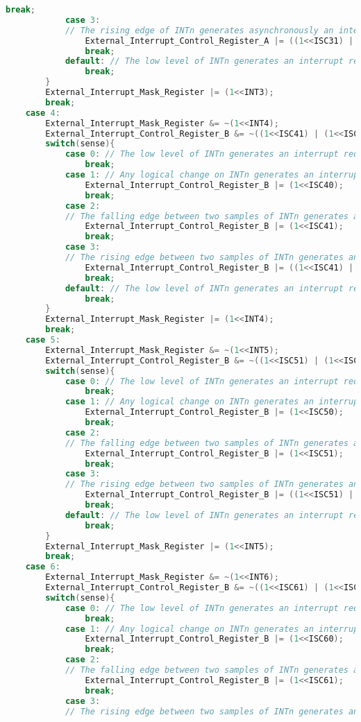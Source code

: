 \begin{lstlisting}[language=C]
				break;
			case 3: 
			// The rising edge of INTn generates asynchronously an interrupt request.
				External_Interrupt_Control_Register_A |= ((1<<ISC31) | (1<<ISC30));
				break;
			default: // The low level of INTn generates an interrupt request.
				break;
		}
		External_Interrupt_Mask_Register |= (1<<INT3);
		break;
	case 4:
		External_Interrupt_Mask_Register &= ~(1<<INT4);
		External_Interrupt_Control_Register_B &= ~((1<<ISC41) | (1<<ISC40));
		switch(sense){
			case 0: // The low level of INTn generates an interrupt request.
				break;
			case 1: // Any logical change on INTn generates an interrupt request
				External_Interrupt_Control_Register_B |= (1<<ISC40);
				break;
			case 2: 
			// The falling edge between two samples of INTn generates an interrupt request.
				External_Interrupt_Control_Register_B |= (1<<ISC41);
				break;
			case 3: 
			// The rising edge between two samples of INTn generates an interrupt request.
				External_Interrupt_Control_Register_B |= ((1<<ISC41) | (1<<ISC40));
				break;
			default: // The low level of INTn generates an interrupt request.
				break;
		}
		External_Interrupt_Mask_Register |= (1<<INT4);
		break;
	case 5:
		External_Interrupt_Mask_Register &= ~(1<<INT5);
		External_Interrupt_Control_Register_B &= ~((1<<ISC51) | (1<<ISC50));
		switch(sense){
			case 0: // The low level of INTn generates an interrupt request.
				break;
			case 1: // Any logical change on INTn generates an interrupt request
				External_Interrupt_Control_Register_B |= (1<<ISC50);
				break;
			case 2: 
			// The falling edge between two samples of INTn generates an interrupt request.
				External_Interrupt_Control_Register_B |= (1<<ISC51);
				break;
			case 3: 
			// The rising edge between two samples of INTn generates an interrupt request.
				External_Interrupt_Control_Register_B |= ((1<<ISC51) | (1<<ISC50));
				break;
			default: // The low level of INTn generates an interrupt request.
				break;
		}
		External_Interrupt_Mask_Register |= (1<<INT5);
		break;
	case 6:
		External_Interrupt_Mask_Register &= ~(1<<INT6);
		External_Interrupt_Control_Register_B &= ~((1<<ISC61) | (1<<ISC60));
		switch(sense){
			case 0: // The low level of INTn generates an interrupt request.
				break;
			case 1: // Any logical change on INTn generates an interrupt request
				External_Interrupt_Control_Register_B |= (1<<ISC60);
				break;
			case 2: 
			// The falling edge between two samples of INTn generates an interrupt request.
				External_Interrupt_Control_Register_B |= (1<<ISC61);
				break;
			case 3: 
			// The rising edge between two samples of INTn generates an interrupt request.

\end{lstlisting}
